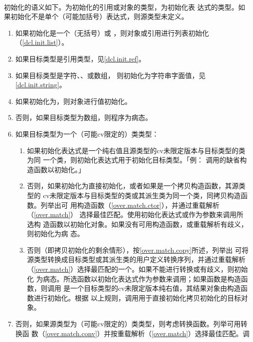 \paragraph{}
初始化的语义如下。为初始化的引用或对象的类型，为初始化表
达式的类型。如果初始化不是单个（可能加括号）表达式，则源类型未定义。
\begin{enumerate}
  \item{如果初始化是一个（无括号）或
    \tm{=} ，则对象或引用进行列表初始化
    （\ref{dcl.init.list}）。}
  \item{如果目标类型是引用类型，见\ref{dcl.init.ref}。}
  \item{如果目标类型是字符、、或数组，
    则初始化为字符串字面值，见\ref{dcl.init.string}。}
  \item{如果初始化为\tm{()}，则对象进行值初始化。}
  \item{否则，如果目标类型为数组，则程序为病态。}
  \item{如果目标类型为一个（可能cv限定的）类类型：
    \begin{enumerate}
      \item{如果初始化表达式是一个纯右值且源类型的cv未限定版本与目标类型的类为同
        一个类，则初始化表达式用于初始化目标类型。「例：
        调用的缺省构造函数以初始化。」}
      \item{否则，如果初始化为直接初始化，或者如果是一个拷贝构造函数，其源类型的
        cv未限定版本与目标类型的类或其派生类为同一个类，同拷贝构造函数。列举出可
        用构造函数（\ref{over.match.ctor}），并通过重载解析（\ref{over.match}）
        选择最佳匹配。使用初始化表达式或作为参数来调用所选构
        造函数以初始化对象。如果没有可用构造函数，或重载解析有歧义，则初始化为病
        态。}
      \item{否则（即拷贝初始化的剩余情形），按\ref{over.match.copy}所述，列举出
        可将源类型转换成目标类型或其派生类的用户定义转换序列，并通过重载解析
        （\ref{over.match}）选择最匹配的一个。如果不能进行转换或有歧义，则初始化
        为病态。所选函数以初始化表达式作为参数来调用；如果函数是构造函数，则调用
        是一个目标类型的cv未限定版本纯右值，其结果对象由构造函数进行初始化。根据
        以上规则，调用用于直接初始化拷贝初始化的目标对象。}
    \end{enumerate}}
  \item{否则，如果源类型为（可能cv限定的）类类型，则考虑转换函数。列举可用转换函
    数（\ref{over.match.conv}）并按重载解析（\ref{over.match}）选择最佳匹配。调
}
\end{enumerate}
